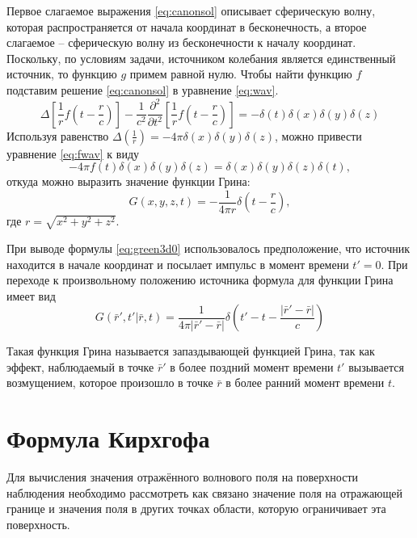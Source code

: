 \documentclass[a4paper, fontsize=14pt]{article}
\begin{document}
Первое слагаемое выражения \ref{eq:canonsol} описывает сферическую волну, которая распространяется от начала координат в бесконечность, а второе слагаемое -- сферическую волну из бесконечности к началу координат. Поскольку, по условиям задачи, источником колебания является единственный источник, то функцию $g$ примем равной нулю.  Чтобы найти функцию  $f$  подставим решение \ref{eq:canonsol} в уравнение \ref{eq:wav}. 
\begin{equation}
	\Delta \left[ \frac{1}{r}f\left(t-\frac{r}{c}\right) \right] - \frac{1}{c^2} \frac{\partial^2 }{\partial
		t^2}\left[ \frac{1}{r}f\left(t-\frac{r}{c}\right) \right]  = - \delta(t)\delta(x)\delta(y)\delta(z)
		\label{eq:fwav}
\end{equation}
Используя равенство $\Delta\left(\frac{1}{r}\right) = -4\pi \delta(x)\delta(y)\delta(z)$, можно привести уравнение \ref{eq:fwav}
к виду 
\begin{equation}
	-4\pi f(t) \delta(x) \delta(y) \delta(z)  = \delta(x) \delta(y) \delta(z) \delta(t),
\label{eq:fdel}	
\end{equation}
откуда можно выразить значение функции Грина:
\begin{equation}
	G(x,y,z,t) = -\frac{1}{4\pi r} \delta \left(t - \frac{r}{c}\right),
\label{eq:green3d0}	
\end{equation}  
где $r = \sqrt{x^2+y^2+z^2}$.

При выводе формулы \ref{eq:green3d0} использовалось предположение,  что источник находится в начале координат  и посылает импульс в момент времени $t' = 0$. При переходе к произвольному положению источника 
формула для функции Грина имеет вид
\begin{equation}
	G(\bar{r}',t'|\bar{r},t)= \frac{1}{4\pi|\bar{r}'-\bar{r}|}
	\delta\left(t'-t-\frac{|\bar{r}'-\bar{r}|}{c}\right)
\label{eq:green3d}
\end{equation}

	Такая функция Грина называется запаздывающей функцией Грина, так как эффект,
	наблюдаемый в точке $\bar{r}'$ в более поздний момент времени $t'$ вызывается
	возмущением,
	которое произошло в точке $\bar{r}$ в более ранний момент времени $t$.

	

	\section{Формула Кирхгофа}
	Для вычисления значения отражённого волнового поля на поверхности наблюдения необходимо 
	рассмотреть как связано значение поля на отражающей границе и значения поля в других точках области, которую ограничивает эта поверхность.   
	
\end{document}
